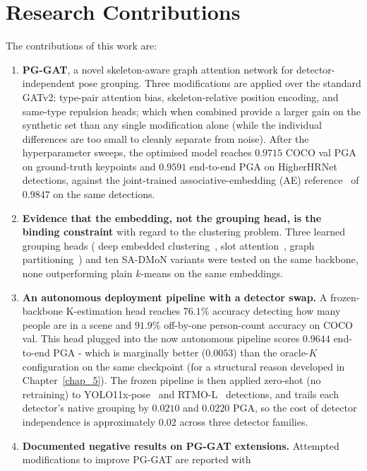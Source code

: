 \section{Research Contributions}
\label{sec_intro_contributions}

The contributions of this work are:
\begin{enumerate}
\item \textbf{PG-GAT}, a novel skeleton-aware graph attention network for detector-independent pose grouping.
Three modifications are applied over the standard GATv2:
type-pair attention bias, skeleton-relative position encoding, and same-type repulsion heads;
which when combined provide a larger gain on the synthetic set than any single modification
alone (while the individual differences are too small to cleanly separate from noise).
After the hyperparameter sweeps, the optimised model reaches $0.9715$ COCO val PGA on ground-truth keypoints
and $0.9591$ end-to-end PGA on HigherHRNet detections,
against the joint-trained associative-embedding (AE) reference~\cite{newell2017associative, cheng2020higherhrnet}
of $0.9847$ on the same detections.
\item \textbf{Evidence that the embedding, not the grouping head, is the binding constraint}
with regard to the clustering problem.
Three learned grouping heads (
deep embedded clustering~\cite{xie2016dec}, slot attention~\cite{locatello2020slotattention},
graph partitioning~\cite{yang2020gcnve})
and ten SA-DMoN variants were tested on the same backbone, none outperforming plain $k$-means on the same embeddings.
\item \textbf{An autonomous deployment pipeline with a detector swap.}
A frozen-backbone K-estimation head reaches $76.1\%$ accuracy detecting how many people are in a scene
and $91.9\%$ off-by-one person-count accuracy on COCO val. This head plugged into the now 
autonomous pipeline scores $0.9644$ end-to-end PGA - which is marginally better ($0.0053$) 
than the oracle-$K$ configuration on the same checkpoint (for a structural reason developed 
in Chapter~\ref{chap_5}). The frozen pipeline
is then applied zero-shot (no retraining) to 
YOLO11x-pose~\cite{ultralytics2024yolo11} and RTMO-L~\cite{lu2024rtmo} detections,
and trails each detector's native grouping by $0.0210$ and $0.0220$ PGA,
so the cost of detector independence is approximately $0.02$ across three detector families.
\item \textbf{Documented negative results on PG-GAT extensions.}
Attempted modifications to improve PG-GAT are reported with 

\end{enumerate}
